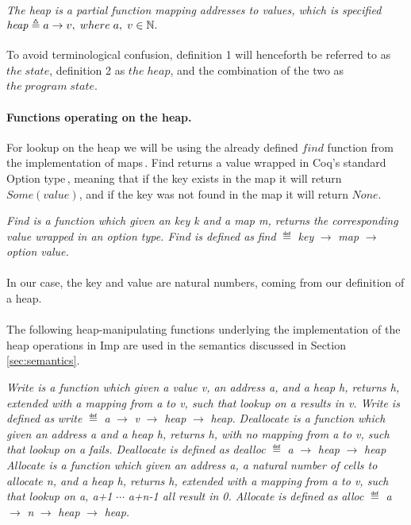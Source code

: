  \textit{The heap is a partial function mapping addresses to values, which is specified } $\mathit{heap} \mathrel{\triangleq} a\to v, \; where\; a, \;v \in \mathbb{N}.$

\paragraph{} %
To avoid terminological confusion, definition 1 will henceforth be referred to as $the\;state$, definition 2 as $the\;heap$, and the combination of the two as $the\;program\;state$.

\paragraph{Functions operating on the heap.}
For lookup on the heap we will be using the already defined $find$ function from the implementation of maps\,\cite{CoqContainers}. Find returns a value wrapped in Coq's standard Option type\,\cite{CoqOption}, meaning that if the key exists in the map it will return $Some(value)$, and if the key was not found in the map it will return $None$.

 \textit{Find is a function which given an key k and a map m, returns the corresponding value wrapped in an option type. Find is defined as }{\it find} $\eqdef$ {\it key} $\to$ {\it map} $\to$ {\it option value.}

\paragraph{}
In our case, the key and value are natural numbers, coming from our definition of a heap.
\paragraph{}
The following heap-manipulating functions underlying the implementation of the heap operations in Imp are used in the semantics discussed in Section \ref{sec:semantics}.

\textit{Write is a function which given a value v, an address a, and a heap h, returns h, extended with a mapping from a to v, such that lookup on a results in v. Write is defined as} {\it write} $\eqdef$ {\it a} $\to$ {\it v} $\to$ {\it heap} $\to$ {\it heap.}
 \textit{Deallocate is a function which given an address a and a heap h, returns h, with no mapping from a to v, such that lookup on a fails. Deallocate is defined as }{\it dealloc} $\eqdef$ {\it a} $\to$ {\it heap} $\to$ {\it heap}
 \textit{Allocate is a function which given an address a, a natural number of cells to allocate n, and a heap h, returns h, extended with a mapping from a to v, such that lookup on a, a+1} $\cdots$ \textit{a+n-1 all result in 0. Allocate is defined as }{\it alloc} $\eqdef$ {\it a} $\to$ {\it n} $\to$ {\it heap} $\to$ {\it heap.}

